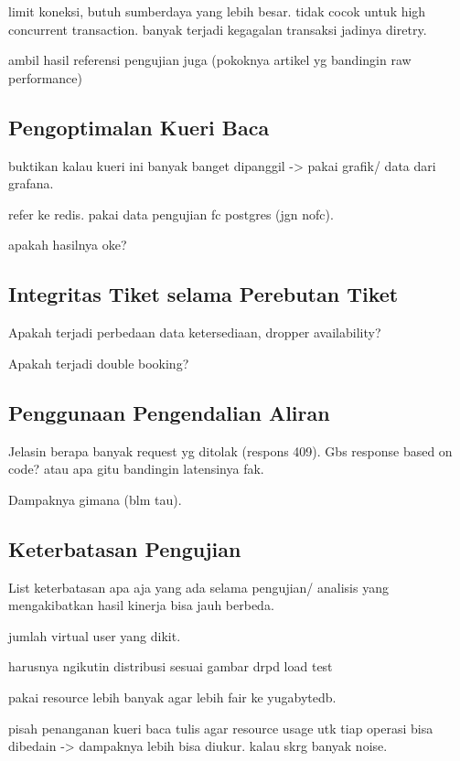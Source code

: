 limit koneksi, butuh sumberdaya yang lebih besar. tidak cocok untuk high concurrent transaction. banyak terjadi kegagalan transaksi jadinya diretry.

ambil hasil referensi pengujian juga (pokoknya artikel yg bandingin raw performance)

\subsection{Pengoptimalan Kueri Baca}

buktikan kalau kueri ini banyak banget dipanggil -> pakai grafik/ data dari grafana.  

refer ke redis. pakai data pengujian fc postgres (jgn nofc). 

apakah hasilnya oke?

\subsection{Integritas Tiket selama Perebutan Tiket}

Apakah terjadi perbedaan data ketersediaan, dropper availability?

Apakah terjadi double booking?

\subsection{Penggunaan Pengendalian Aliran}

Jelasin berapa banyak request yg ditolak (respons 409). Gbs response based on code? atau apa gitu bandingin latensinya fak.

Dampaknya gimana (blm tau).

\subsection{Keterbatasan Pengujian}

List keterbatasan apa aja yang ada selama pengujian/ analisis yang mengakibatkan hasil kinerja bisa jauh berbeda.

jumlah virtual user yang dikit.

harusnya ngikutin distribusi sesuai gambar drpd load test

pakai resource lebih banyak agar lebih fair ke yugabytedb.

pisah penanganan kueri baca tulis agar resource usage utk tiap operasi bisa dibedain -> dampaknya lebih bisa diukur. kalau skrg banyak noise.
